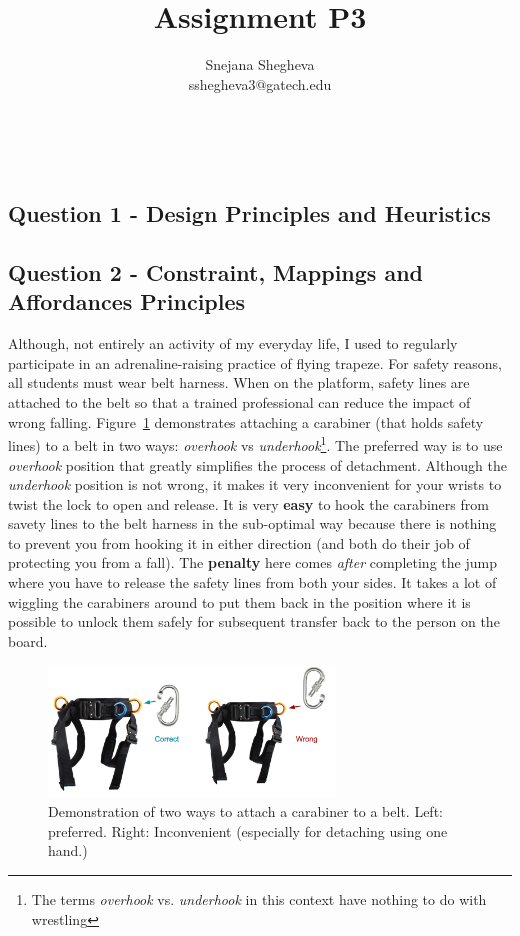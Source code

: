 \documentclass[12pt,letterpaper]{article}
\makeatletter
\renewcommand{\maketitle}{\bgroup
   \begin{center}
   \textbf{{\fontsize{18pt}{20}\selectfont \@title}}\\
   \vspace{10pt}
   {\fontsize{12pt}{0}\selectfont \@author} 
   \end{center}
}
\makeatother
\begin{document}
\title{Assignment P3}
\author{Snejana Shegheva \\ sshegheva3@gatech.edu}

\maketitle
\thispagestyle{fancy}

\subsection*{Question 1 - Design Principles and Heuristics}

\subsection*{Question 2 - Constraint, Mappings and Affordances Principles}

Although, not entirely an activity of my everyday life, I used to regularly participate in an adrenaline-raising practice of flying trapeze. For safety reasons, all students must wear belt harness. When on the platform, safety lines are attached to the belt so that a trained professional can reduce the impact of wrong falling. Figure~\ref{fig::1} demonstrates attaching a carabiner (that holds safety lines) to a belt in two ways: \textit{overhook} vs \textit{underhook}\footnote{The terms \textit{overhook} vs. \textit{underhook} in this context have nothing to do with wrestling}. The preferred way is to use \textit{overhook} position that greatly simplifies the process of detachment. Although the \textit{underhook} position is not wrong, it makes it very inconvenient for your wrists to twist the lock to open and release. It is very \textbf{easy} to hook the carabiners from savety lines to the belt harness in the sub-optimal way because there is nothing to prevent you from hooking it in either direction (and both do their job of protecting you from a fall). The \textbf{penalty} here comes \textit{after} completing the jump where you have to release the safety lines from both your sides. It takes a lot of wiggling the carabiners around to put them back in the position where it is possible to unlock them safely for subsequent transfer back to the person on the board.   

\begin{figure}[h]
\centering
\includegraphics[width=3in,scale=.5]{figures/p3/flying_trapeze.png}
\caption{Demonstration of two ways to attach a carabiner to a belt. Left: preferred. Right: Inconvenient (especially for detaching using one hand.)}
\label{fig::1}
\end{figure}
\end{document}
